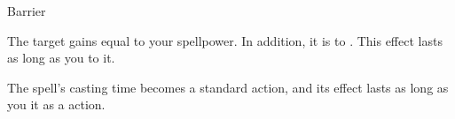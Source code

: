 \begin{spellsection}{Barrier}
\begin{spellheader}
\end{spellheader}
\begin{spellcontent}
\begin{spelltargetinginfo}
\end{spelltargetinginfo}
\begin{spelleffects}
\spelleffect
The target gains  equal to your spellpower.
In addition, it is  to .
This effect lasts as long as you  to it.
\end{spelleffects}
\end{spellcontent}
\begin{spellfooter}
\end{spellfooter}
\begin{spellsubcontent}
\begin{spellcantrip}
The spell's casting time becomes a standard action, and its effect lasts as long as you  it as a  action.
\end{spellcantrip}
\end{spellsubcontent}
\end{spellsection}
